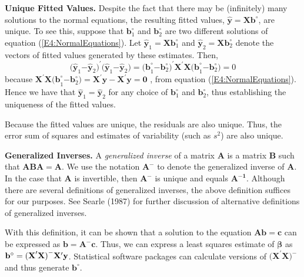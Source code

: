 \textbf{Unique Fitted Values.} Despite the fact that there may be
(infinitely) many solutions to the normal equations, the resulting
fitted values, $\mathbf{\hat{y}}=\mathbf{Xb}^{\circ }$, are unique.
To see this, suppose that $\mathbf{b}_1^{\circ }$ and
$\mathbf{b}_2^{\circ }$ are two
different solutions of equation (\ref{E4:NormalEquations}). Let $\mathbf{\hat{y}}_1=\mathbf{Xb%
}_1^{\circ }$ and $\mathbf{\hat{y}}_2=\mathbf{Xb}_2^{\circ }$ denote
the vectors of fitted values generated by these estimates. Then,
\begin{equation*}
\mathbf{(\hat{y}}_1\mathbf{-\hat{y}}_2\mathbf{)}^{\prime }\mathbf{(\hat{y%
}}_1\mathbf{-\hat{y}}_2\mathbf{)}=\mathbf{(b}_1^{\circ }\mathbf{-b}%
_2^{\circ }\mathbf{)}^{\prime }\mathbf{X}^{\prime
}\mathbf{X(b}_1^{\circ }\mathbf{-b}_2^{\circ }\mathbf{)}=0
\end{equation*}
because $\mathbf{X}^{\prime }\mathbf{X(b}_1^{\circ
}\mathbf{-b}_2^{\circ
}\mathbf{)}=\mathbf{X}^{\prime }\mathbf{y-X}^{\prime }\mathbf{y}=\mathbf{0}$%
, from equation (\ref{E4:NormalEquations}). Hence we have that $\mathbf{\hat{y}}_1\mathbf{=%
\hat{y}}_2$ for any choice of $\mathbf{b}_1^{\circ }$ and $\mathbf{b}%
_2^{\circ }$, thus establishing the uniqueness of the fitted values.

\qquad Because the fitted values are unique, the residuals are also
unique. Thus, the error sum of squares and estimates of variability
(such as $s^2$) are also unique.

\textbf{Generalized Inverses.} A \emph{generalized inverse} of a
matrix $\mathbf{A}$
is a matrix $\mathbf{B}$ such that $\mathbf{ABA=A}$. We use the notation $%
\mathbf{A}^{\mathbf{-}}$ to denote the generalized inverse of
$\mathbf{A}$. In the case that $\mathbf{A}$ is invertible, then
$\mathbf{A}^{\mathbf{-}}$ is unique and equals
$\mathbf{A}^{\mathbf{-1}}$. Although there are several definitions
of generalized inverses, the above definition suffices for our
purposes. See Searle (1987) for further discussion of alternative
definitions of generalized inverses.

\qquad With this definition, it can be shown that a solution to the
equation $\mathbf{Ab=c}$ can be expressed as $\mathbf{b=A}^{-}
\mathbf{c}$. Thus, we
can express a least squares estimate of $\boldsymbol \beta$ as $\mathbf{b}^{%
\mathbf{\circ }}=\mathbf{(X}^{\prime }\mathbf{X)}^{\mathbf{-}}\mathbf{X}%
^{\prime }\mathbf{y}$. Statistical software packages can calculate
versions
of $\mathbf{(X}^{\prime }\mathbf{X)}^{\mathbf{-}}$ and thus generate $%
\mathbf{b}^{\mathbf{\circ }}$.

